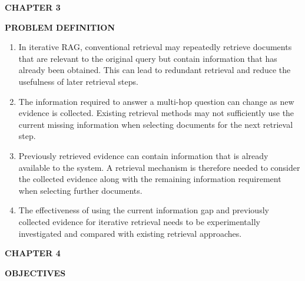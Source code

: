 \documentclass[12pt,a4paper]{report}
\newcommand{\chaptertitle}[2]{
    \begin{center}
        {\fontsize{18}{21}\selectfont\bfseries CHAPTER #1\par}
        \vspace{0.10in}
        {\fontsize{18}{21}\selectfont\bfseries #2\par}
    \end{center}
    \vspace{0.12in}
}
\begin{document}
\clearpage



\chaptertitle{3}{PROBLEM DEFINITION}

\justifying

\begin{enumerate}[
    leftmargin=0.30in,
    itemsep=0.12in,
    parsep=0pt
]

\item
In iterative RAG, conventional retrieval may repeatedly retrieve documents that are relevant to the original query but contain information that has already been obtained. This can lead to redundant retrieval and reduce the usefulness of later retrieval steps.

\item
The information required to answer a multi-hop question can change as new evidence is collected. Existing retrieval methods may not sufficiently use the current missing information when selecting documents for the next retrieval step.

\item
Previously retrieved evidence can contain information that is already available to the system. A retrieval mechanism is therefore needed to consider the collected evidence along with the remaining information requirement when selecting further documents.

\item
The effectiveness of using the current information gap and previously collected evidence for iterative retrieval needs to be experimentally investigated and compared with existing retrieval approaches.

\end{enumerate}

\clearpage




\chaptertitle{4}{OBJECTIVES}
\end{document}
